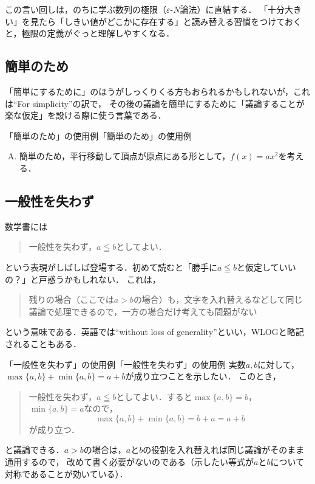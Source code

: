 この言い回しは，のちに学ぶ数列の極限（$\varepsilon$-$N$論法）に直結する．
「十分大きい」を見たら「しきい値がどこかに存在する」と読み替える習慣をつけておくと，極限の定義がぐっと理解しやすくなる．

\subsection{簡単のため}

「簡単にするために」のほうがしっくりくる方もおられるかもしれないが，これは``For simplicity''の訳で，
その後の議論を簡単にするために「議論することが楽な仮定」を設ける際に使う言葉である．

\begin{example}{「簡単のため」の使用例}{「簡単のため」の使用例}
  \begin{enumerate}[(A)]
    \item 簡単のため，平行移動して頂点が原点にある形として，$f(x)=ax^2$を考える．
  \end{enumerate}
\end{example}

\subsection{一般性を失わず}

数学書には
\begin{quote}
  一般性を失わず，$a \leqq b$としてよい．
\end{quote}
という表現がしばしば登場する．初めて読むと「勝手に$a \leqq b$と仮定していいの？」と戸惑うかもしれない．
これは，
\begin{quote}
  残りの場合（ここでは$a > b$の場合）も，文字を入れ替えるなどして同じ議論で処理できるので，一方の場合だけ考えても問題がない
\end{quote}
という意味である．英語では``without loss of generality''といい，WLOGと略記されることもある．

\begin{example}{「一般性を失わず」の使用例}{「一般性を失わず」の使用例}
  実数$a,b$に対して，$\max\{a,b\} + \min\{a,b\} = a+b$が成り立つことを示したい．
  このとき，
  \begin{quote}
    一般性を失わず，$a \leqq b$としてよい．すると$\max\{a,b\}=b$，$\min\{a,b\}=a$なので，
    \[
      \max\{a,b\} + \min\{a,b\} = b + a = a + b
    \]
    が成り立つ．
  \end{quote}
  と議論できる．$a > b$の場合は，$a$と$b$の役割を入れ替えれば同じ議論がそのまま通用するので，
  改めて書く必要がないのである（示したい等式が$a$と$b$について対称であることが効いている）．
\end{example}

